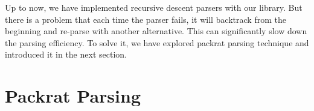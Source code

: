 Up to now, we have implemented recursive descent parsers with our library. But there is a problem that each time the parser fails, it will backtrack from the beginning and re-parse with another alternative. This can significantly slow down the parsing efficiency. To solve it, we have explored packrat parsing technique and introduced it in the next section.

\section{Packrat Parsing}
